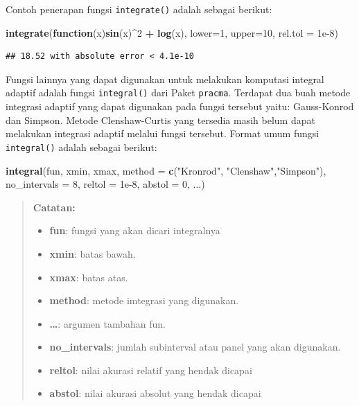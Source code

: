 \documentclass[
]{book}
\newenvironment{Shaded}{\begin{snugshade}}{\end{snugshade}}
\newcommand{\AttributeTok}[1]{\textcolor[rgb]{0.13,0.29,0.53}{#1}}
\newcommand{\ControlFlowTok}[1]{\textcolor[rgb]{0.13,0.29,0.53}{\textbf{#1}}}
\newcommand{\DecValTok}[1]{\textcolor[rgb]{0.00,0.00,0.81}{#1}}
\newcommand{\FloatTok}[1]{\textcolor[rgb]{0.00,0.00,0.81}{#1}}
\newcommand{\FunctionTok}[1]{\textcolor[rgb]{0.13,0.29,0.53}{\textbf{#1}}}
\newcommand{\NormalTok}[1]{#1}
\newcommand{\SpecialCharTok}[1]{\textcolor[rgb]{0.81,0.36,0.00}{\textbf{#1}}}
\newcommand{\StringTok}[1]{\textcolor[rgb]{0.31,0.60,0.02}{#1}}
\providecommand{\tightlist}{%
  \setlength{\itemsep}{0pt}\setlength{\parskip}{0pt}}
\theoremstyle{definition}
\theoremstyle{definition}
\theoremstyle{definition}
\theoremstyle{definition}
\theoremstyle{remark}
\begin{document}
Contoh penerapan fungsi \texttt{integrate()} adalah sebagai berikut:

\begin{Shaded}
\begin{Highlighting}[]
\FunctionTok{integrate}\NormalTok{(}\ControlFlowTok{function}\NormalTok{(x)}\FunctionTok{sin}\NormalTok{(x)}\SpecialCharTok{\^{}}\DecValTok{2} \SpecialCharTok{+} \FunctionTok{log}\NormalTok{(x),}
          \AttributeTok{lower=}\DecValTok{1}\NormalTok{, }\AttributeTok{upper=}\DecValTok{10}\NormalTok{,}
          \AttributeTok{rel.tol =} \FloatTok{1e{-}8}\NormalTok{)}
\end{Highlighting}
\end{Shaded}

\begin{verbatim}
## 18.52 with absolute error < 4.1e-10
\end{verbatim}

Fungsi lainnya yang dapat digunakan untuk melakukan komputasi integral adaptif adalah fungsi \texttt{integral()} dari Paket \texttt{pracma}. Terdapat dua buah metode integrasi adaptif yang dapat digunakan pada fungsi tersebut yaitu: Gauss-Konrod dan Simpson. Metode Clenshaw-Curtis yang tersedia masih belum dapat melakukan integrasi adaptif melalui fungsi tersebut. Format umum fungsi \texttt{integral()} adalah sebagai berikut:

\begin{Shaded}
\begin{Highlighting}[]
\FunctionTok{integral}\NormalTok{(fun, xmin, xmax,}
         \AttributeTok{method =} \FunctionTok{c}\NormalTok{(}\StringTok{"Kronrod"}\NormalTok{, }\StringTok{"Clenshaw"}\NormalTok{,}\StringTok{"Simpson"}\NormalTok{),}
         \AttributeTok{no\_intervals =} \DecValTok{8}\NormalTok{, }\AttributeTok{reltol =} \FloatTok{1e{-}8}\NormalTok{, }
         \AttributeTok{abstol =} \DecValTok{0}\NormalTok{, ...)}
\end{Highlighting}
\end{Shaded}

\begin{quote}
\textbf{Catatan:}

\begin{itemize}
\tightlist
\item
  \textbf{fun}: fungsi yang akan dicari integralnya
\item
  \textbf{xmin}: batas bawah.
\item
  \textbf{xmax}: batas atas.
\item
  \textbf{method}: metode imtegrasi yang digunakan.
\item
  \textbf{\ldots{}}: argumen tambahan fun.
\item
  \textbf{no\_intervals}: jumlah subinterval atau panel yang akan digunakan.
\item
  \textbf{reltol}: nilai akurasi relatif yang hendak dicapai
\item
  \textbf{abstol}: nilai akurasi absolut yang hendak dicapai
\end{itemize}
\end{quote}
\end{document}
